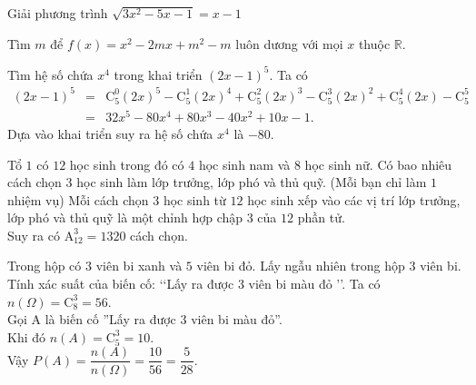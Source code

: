 

\begin{bt}%
    Giải phương trình $ \sqrt{3x^2-5x-1}=x-1 $
    \end{bt}
\begin{bt}%
    Tìm $ m  $ để $ f(x)=x^2-2mx+m^2-m $ luôn dương với mọi $ x $ thuộc $ \mathbb{R} $.
\end{bt}
\begin{bt}%
    Tìm hệ số chứa $ x^4 $ trong khai triển $ (2x-1)^5 $.
    \loigiai
    {
      Ta có 
     \begin{eqnarray*}
          (2x-1)^5 &=&\mathrm{C}_5^0(2x)^5-\mathrm{C}_5^1(2x)^4+\mathrm{C}_5^2(2x)^3-\mathrm{C}_5^3(2x)^2+\mathrm{C}_5^4(2x)-\mathrm{C}_5^5\\
          &=& 32x^5-80x^4+80x^3-40x^2+10x-1.
     \end{eqnarray*}
 Dựa vào khai triển suy ra hệ số chứa $ x^4 $ là $ -80 $.
    }
\end{bt}
\begin{bt}%
    Tổ $ 1 $ có $ 12 $ học sinh trong đó có $ 4 $ học sinh nam và $ 8 $ học sinh nữ. Có bao nhiêu cách chọn $ 3 $ học sinh làm lớp trưởng, lớp phó và thủ quỹ. (Mỗi bạn chỉ làm $ 1 $ nhiệm vụ)
    \loigiai
    {
        Mỗi cách chọn $ 3 $ học sinh từ $ 12 $ học sinh xếp vào các vị trí lớp trưởng, lớp phó và thủ quỹ là một chỉnh hợp chập $ 3 $ của $ 12 $ phần tử.\\
        Suy ra có $ \mathrm{A}_{12}^3=1320 $ cách chọn.
    }
\end{bt}
\begin{bt}%
    Trong hộp có $ 3 $ viên bi xanh và $ 5 $ viên bi đỏ. Lấy ngẫu nhiên trong hộp $ 3 $ viên bi. Tính xác suất của biến cố: \lq\lq Lấy ra được $ 3 $ viên bi màu đỏ \rq\rq.
    \loigiai
    {
        Ta có $ n(\Omega) =\mathrm{C}_8^3=56$.\\
        Gọi A là biến cố ''Lấy ra được $ 3 $ viên bi màu đỏ''.\\
        Khi đó $ n(A)=\mathrm{C}_5^3=10 $.\\
        Vậy $ P(A)=\dfrac{n(A)}{n(\Omega)}=\dfrac{10}{56}=\dfrac{5}{28} $.
    }
\end{bt}

